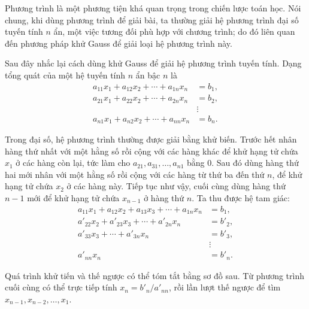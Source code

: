 \documentclass[11pt]{article}
\begin{document}
Phương trình là một phương tiện khá quan trọng trong chiến lược toán học. Nói
chung, khi dùng phương trình để giải bài, ta thường giải hệ phương trình đại
số tuyến tính \(n\) ẩn, một việc tương đối phù hợp với chương trình; do đó
liên quan đến phương pháp khử Gauss để giải loại hệ phương trình này.

Sau đây nhắc lại cách dùng khử Gauss để giải hệ phương trình tuyến tính. Dạng
tổng quát của một hệ tuyến tính \(n\) ẩn bậc \(n\) là
\[
\begin{aligned}
  a_{11}x_1+a_{12}x_2+\cdots+a_{1n}x_n&=b_1,\\
  a_{21}x_1+a_{22}x_2+\cdots+a_{2n}x_n&=b_2,\\
  &\vdots\\
  a_{n1}x_1+a_{n2}x_2+\cdots+a_{nn}x_n&=b_n.
\end{aligned}
\]

Trong đại số, hệ phương trình thường được giải bằng khử biến. Trước hết nhân
hàng thứ nhất với một hằng số rồi cộng với các hàng khác để khử hạng tử chứa
\(x_1\) ở các hàng còn lại, tức làm cho \(a_{21},a_{31},\ldots,a_{n1}\) bằng
0. Sau đó dùng hàng thứ hai mới nhân với một hằng số rồi cộng với các hàng từ
thứ ba đến thứ \(n\), để khử hạng tử chứa \(x_2\) ở các hàng này. Tiếp tục như
vậy, cuối cùng dùng hàng thứ \(n-1\) mới để khử hạng tử chứa \(x_{n-1}\) ở
hàng thứ \(n\). Ta thu được hệ tam giác:
\[
\begin{aligned}
  a_{11}x_1+a_{12}x_2+a_{13}x_3+\cdots+a_{1n}x_n&=b_1,\\
  a'_{22}x_2+a'_{23}x_3+\cdots+a'_{2n}x_n&=b'_2,\\
  a'_{33}x_3+\cdots+a'_{3n}x_n&=b'_3,\\
  &\vdots\\
  a'_{nn}x_n&=b'_n.
\end{aligned}
\]

Quá trình khử tiến và thế ngược có thể tóm tắt bằng sơ đồ sau. Từ phương
trình cuối cùng có thể trực tiếp tính \(x_n=b'_n/a'_{nn}\), rồi lần lượt thế
ngược để tìm \(x_{n-1},x_{n-2},\ldots,x_1\).
\end{document}
